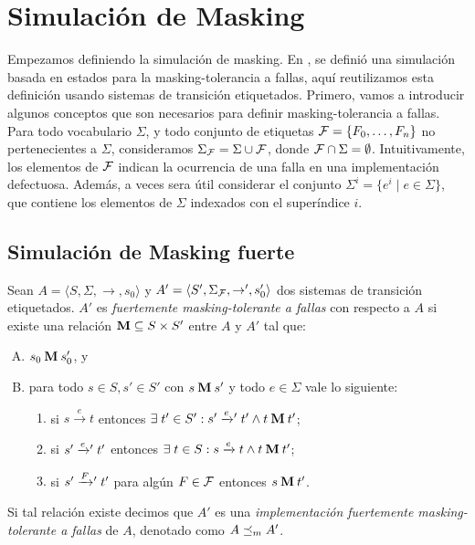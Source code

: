 \section{Simulación de Masking} \label{sec:masking_dist}
Empezamos definiendo la simulación de masking. En \cite{DemasiCMA17}, se definió una simulación basada en estados para la masking-tolerancia a fallas, aquí reutilizamos esta definición usando sistemas de transición etiquetados. Primero, vamos a introducir algunos conceptos que son necesarios para definir masking-tolerancia a fallas. Para todo vocabulario $\Sigma$, y todo conjunto de etiquetas $\mathcal{F} = \{F_0, \dots, F_n\}$ no pertenecientes a $\Sigma$, consideramos 
$\Sigma_{\mathcal{F}} = \Sigma \cup \mathcal{F}$, donde $\mathcal{F} \cap \Sigma = \emptyset$. Intuitivamente, los elementos de $\mathcal{F}$ indican la ocurrencia de una falla en una implementación defectuosa. Además, a veces sera útil considerar el conjunto $\Sigma^i = \{ e^i \mid e \in \Sigma\}$, que contiene los elementos de $\Sigma$ indexados con el superíndice $i$.


\subsection{Simulación de Masking fuerte}
\begin{defi} \label{def:masking_rel}
  Sean $A =\langle S, \Sigma, \rightarrow, s_0\rangle$ y $A' =\langle S', \Sigma_{\mathcal{F}}, \rightarrow', s_0' \rangle$ dos sistemas de transición etiquetados.
  $A'$ es \emph{fuertemente masking-tolerante a fallas} con respecto a $A$ si existe una relación 
$\mathbin{\mathbf{M}} \subseteq S \times S'$ entre $A$ y $A'$ tal que:

\begin{enumerate}[(A)]
  \item $s_0 \mathbin{\mathbf{M}} s'_0$, y
  \item para todo $s \in S, s' \in S'$ con $s \mathbin{\mathbf{M}} s'$ y todo $e \in \Sigma$ vale lo siguiente:

  \begin{enumerate}[(1)]
    \item 
    si $s \xrightarrow{e} t$ entonces
    $\exists\; t' \in S': s' \mathrel{{\xrightarrow[]{e}}{}'} t'  \wedge t \mathbin{\mathbf{M}} t'$;

      \item si $s' \mathrel{{\xrightarrow[]{e}}{}'} t'$ entonces
      $\exists \; t \in S: s \xrightarrow{e} t \wedge t \mathbin{\mathbf{M}} t'$;

      \item si $s' \mathrel{{\xrightarrow[]{F}}{}'} t' $ para algún $F \in \mathcal{F}$ entonces
      $s \mathbin{\mathbf{M}} t'$.
      
  \end{enumerate}
\end{enumerate}

Si tal relación existe decimos que $A'$ es una \emph{implementación fuertemente masking-tolerante a fallas} de $A$, denotado como $A \preceq_{m} A'$. 
\end{defi}

